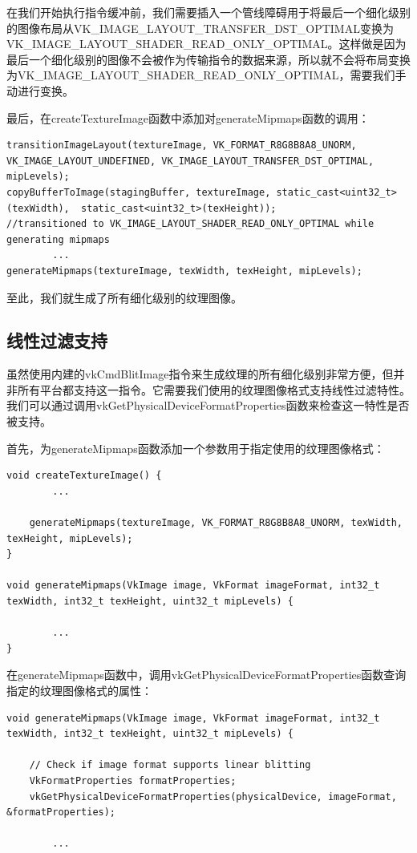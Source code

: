 \documentclass{ctexart}
\begin{document}
在我们开始执行指令缓冲前，我们需要插入一个管线障碍用于将最后一个细化级别的图像布局从VK\_IMAGE\_LAYOUT\_TRANSFER\_DST\_OPTIMAL变换为VK\_IMAGE\_LAYOUT\_SHADER\_READ\_ONLY\_OPTIMAL。这样做是因为最后一个细化级别的图像不会被作为传输指令的数据来源，所以就不会将布局变换为VK\_IMAGE\_LAYOUT\_SHADER\_READ\_ONLY\_OPTIMAL，需要我们手动进行变换。

最后，在createTextureImage函数中添加对generateMipmaps函数的调用：

\begin{lstlisting}[language={[ANSI]C}]
transitionImageLayout(textureImage, VK_FORMAT_R8G8B8A8_UNORM, VK_IMAGE_LAYOUT_UNDEFINED, VK_IMAGE_LAYOUT_TRANSFER_DST_OPTIMAL, mipLevels);
copyBufferToImage(stagingBuffer, textureImage, static_cast<uint32_t>(texWidth),  static_cast<uint32_t>(texHeight));
//transitioned to VK_IMAGE_LAYOUT_SHADER_READ_ONLY_OPTIMAL while generating mipmaps
		...
generateMipmaps(textureImage, texWidth, texHeight, mipLevels);
\end{lstlisting}

至此，我们就生成了所有细化级别的纹理图像。

\subsection{线性过滤支持}

虽然使用内建的vkCmdBlitImage指令来生成纹理的所有细化级别非常方便，但并非所有平台都支持这一指令。它需要我们使用的纹理图像格式支持线性过滤特性。我们可以通过调用vkGetPhysicalDeviceFormatProperties函数来检查这一特性是否被支持。

首先，为generateMipmaps函数添加一个参数用于指定使用的纹理图像格式：

\begin{lstlisting}[language={[ANSI]C}]
void createTextureImage() {
		...

	generateMipmaps(textureImage, VK_FORMAT_R8G8B8A8_UNORM, texWidth, texHeight, mipLevels);
}

void generateMipmaps(VkImage image, VkFormat imageFormat, int32_t texWidth, int32_t texHeight, uint32_t mipLevels) {

		...
}
\end{lstlisting}

在generateMipmaps函数中，调用vkGetPhysicalDeviceFormatProperties函数查询指定的纹理图像格式的属性：

\begin{lstlisting}[language={[ANSI]C}]
void generateMipmaps(VkImage image, VkFormat imageFormat, int32_t texWidth, int32_t texHeight, uint32_t mipLevels) {

	// Check if image format supports linear blitting
	VkFormatProperties formatProperties;
	vkGetPhysicalDeviceFormatProperties(physicalDevice, imageFormat, &formatProperties);

		...
\end{lstlisting}
\end{document}
